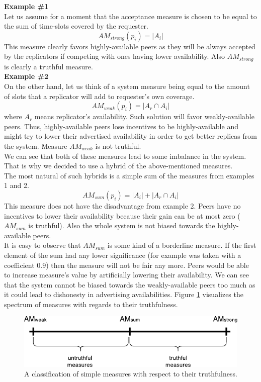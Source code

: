 \documentclass{pracamgren}
\begin{document}
{\bf Example \#1}\\
Let us assume for a moment that the acceptance measure is chosen to be equal to the sum of time-slots covered by the requester.
$$AM_{strong}(p_i) = |A_i|$$
This measure clearly favors highly-available peers as they will be always accepted by the replicators if competing with ones having lower availability. Also $AM_{strong}$ is clearly a truthful measure.\\

{\bf Example \#2}\\
On the other hand, let us think of a system measure being equal to the amount of slots that a replicator will add to requester's own coverage.
$$AM_{weak}(p_i) = |A_r \cap A_i|$$
where $A_r$ means replicator's availability.
Such solution will favor weakly-available peers. Thus, highly-available peers lose incentives to be highly-available and might try to lower their advertised availability in order to get better replicas from the system. Measure $AM_{weak}$ is not truthful.\\

We can see that both of these measures lead to some imbalance in the system. That is why we decided to use a hybrid of the above-mentioned measures.\\

The most natural of such hybrids is a simple sum of the measures from examples 1 and 2.
$$AM_{sum}(p_i) = |A_i| + |A_r \cap A_i|$$
This measure does not have the disadvantage from example 2. Peers have no incentives to lower their availability because their gain can be at most zero ($AM_{sum}$ is truthful). Also the whole system is not biased towards the highly-available peers.\\

It is easy to observe that $AM_{sum}$ is some kind of a borderline measure. If the first element of the sum had any lower significance (for example was taken with a coefficient $0.9$) then the measure will not be fair any more. Peers would be able to increase measure's value by artificially lowering their availability. We can see that the system cannot be biased towards the weakly-available peers too much as it could lead to dishonesty in advertising availabilities. Figure \ref{fig:measures} visualizes the spectrum of measures with regards to their truthfulness.\\

\begin{figure}[h]
\centering
\includegraphics{measures.pdf}
\caption{A classification of simple measures with respect to their truthfulness.}
\label{fig:measures}
\end{figure}
\end{document}
